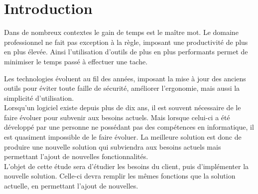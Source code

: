 \cleardoublepage

\chapter*{Introduction}





Dans de nombreux contextes le gain de temps est le maître mot. Le domaine professionnel ne fait pas exception à la règle, imposant une productivité de plus en plus élevée. Ainsi l'utilisation d'outils de plus en plus performants permet de minimiser le temps passé à effectuer une tache.


Les technologies évoluent au fil des années, imposant la mise à jour des anciens outils pour éviter toute faille de sécurité, améliorer l'ergonomie, mais aussi la simplicité d'utilisation.
\\


Lorsqu'un logiciel existe depuis plus de dix ans, il est souvent nécessaire de le faire évoluer pour subvenir aux besoins actuels. Mais lorsque celui-ci a été développé par une personne ne possédant pas des compétences en informatique, il est quasiment impossible de le faire évoluer. La meilleure solution est donc de produire une nouvelle solution qui subviendra aux besoins actuels mais permettant l'ajout de nouvelles fonctionnalités.
\\


L'objet de cette étude sera d'étudier les besoins du client, puis d'implémenter la nouvelle solution. Celle-ci devra remplir les mêmes fonctions que la solution actuelle, en permettant l'ajout de nouvelles.
\\

